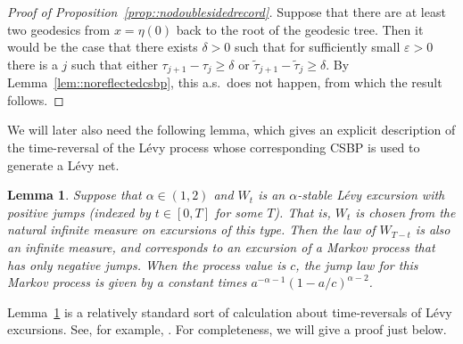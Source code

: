 \documentclass[10pt]{amsart}
\let\epsilon\varepsilon
\theoremstyle{plain}
\numberwithin{theorem}{section}
\newtheorem{lemma}[theorem]{Lemma}
\theoremstyle{definition}
\let\wt\widetilde
\begin{document}
\begin{proof}[Proof of Proposition~\ref{prop::nodoublesidedrecord}]
Suppose that there are at least two geodesics from $x=\eta(0)$ back to the root of the geodesic tree. Then it would be the case that there exists $\delta > 0$ such that for sufficiently small $\epsilon > 0$ there is a $j$ such that either $\tau_{j+1}-\tau_j \geq \delta$ or $\wt{\tau}_{j+1}-\wt{\tau}_j \geq \delta$. By Lemma~\ref{lem::noreflectedcsbp}, this a.s.\ does not happen, from which the result follows.
\end{proof}

We will later also need the following lemma, which gives an explicit description of the time-reversal of the Lévy process whose corresponding CSBP is used to generate a Lévy net.

\begin{lemma}
\label{lem::levyreversal}
Suppose that $\alpha \in (1,2)$ and $W_t$ is an $\alpha$-stable Lévy excursion with positive jumps (indexed by $t \in [0,T]$ for some $T$). That is, $W_t$ is chosen from the natural infinite measure on excursions of this type. Then the law of $W_{T-t}$ is also an infinite measure, and corresponds to an excursion of a Markov process that has only negative jumps. When the process value is $c$, the jump law for this Markov process is given by a constant times $a^{-\alpha-1} (1-a/c)^{\alpha - 2}$.
\end{lemma}

Lemma~\ref{lem::levyreversal} is a relatively standard sort of calculation about time-reversals of Lévy excursions. See, for example, \cite[Th.\,4]{ch1996levy}. For completeness, we will give a proof just below.
\end{document}
